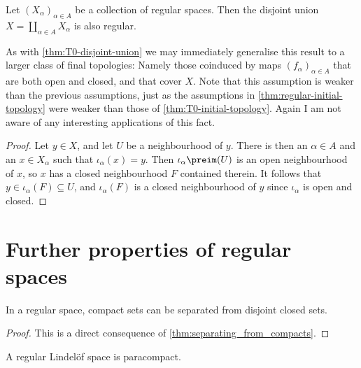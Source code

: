 \documentclass[article, a4paper, 11pt, oneside]{memoir}
\numberwithin{equation}{chapter}
\begin{document}
\begin{proposition}
    Let $(X_\alpha)_{\alpha \in A}$ be a collection of regular spaces. Then the disjoint union $X = \coprod_{\alpha \in A} X_\alpha$ is also regular. %
\end{proposition}
%
As with \cref{thm:T0-disjoint-union} we may immediately generalise this result to a larger class of final topologies: Namely those coinduced by maps $(f_\alpha)_{\alpha \in A}$ that are both open and closed, and that cover $X$. Note that this assumption is weaker than the previous assumptions, just as the assumptions in \cref{thm:regular-initial-topology} were weaker than those of \cref{thm:T0-initial-topology}. Again I am not aware of any interesting applications of this fact.

\begin{proof}
    Let $y \in X$, and let $U$ be a neighbourhood of $y$. There is then an $\alpha \in A$ and an $x \in X_\alpha$ such that $\iota_\alpha(x) = y$. Then $\iota_\alpha\preim(U)$ is an open neighbourhood of $x$, so $x$ has a closed neighbourhood $F$ contained therein. It follows that $y \in \iota_\alpha(F) \subseteq U$, and $\iota_\alpha(F)$ is a closed neighbourhood of $y$ since $\iota_\alpha$ is open and closed.
\end{proof}


\section{Further properties of regular spaces}

\begin{proposition}
    In a regular space, compact sets can be separated from disjoint closed sets.
\end{proposition}

\begin{proof}
    This is a direct consequence of \cref{thm:separating_from_compacts}.
\end{proof}


\begin{proposition}
    \label{thm:regular-Lindelof-is-paracompact}
    A regular Lindelöf space is paracompact.
\end{proposition}
\end{document}
